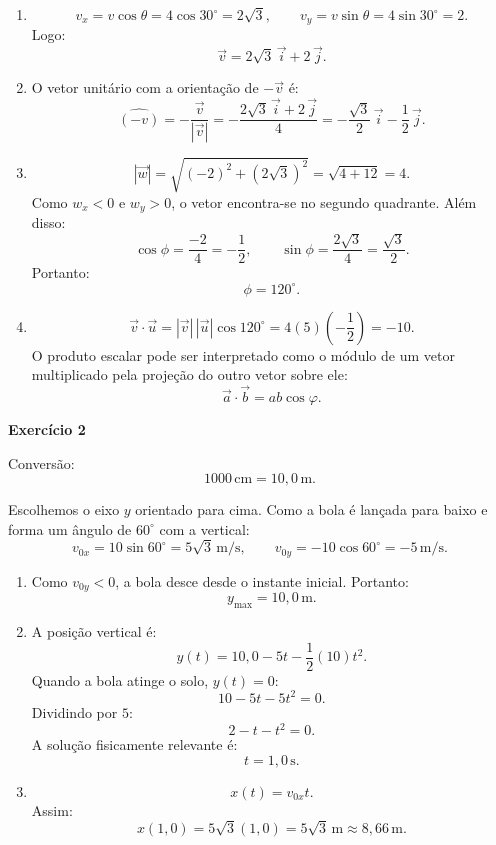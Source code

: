 \documentclass[12pt]{article}
\begin{document}
\begin{enumerate}[label=\textbf{\alph*)}]
    \item
    \[
    v_x=v\cos\theta=4\cos30^\circ=2\sqrt{3},
    \qquad
    v_y=v\sin\theta=4\sin30^\circ=2.
    \]
    Logo:
    \[
    \vec{v}=2\sqrt{3}\,\vec{i}+2\,\vec{j}.
    \]

    \item O vetor unitário com a orientação de $-\vec{v}$ é:
    \[
    \widehat{(-v)}
    =-\frac{\vec{v}}{|\vec{v}|}
    =-\frac{2\sqrt{3}\,\vec{i}+2\,\vec{j}}{4}
    =-\frac{\sqrt{3}}{2}\,\vec{i}-\frac12\,\vec{j}.
    \]

    \item
    \[
    |\vec{w}|=\sqrt{(-2)^2+(2\sqrt{3})^2}
    =\sqrt{4+12}=4.
    \]
    Como $w_x<0$ e $w_y>0$, o vetor encontra-se no segundo quadrante. Além disso:
    \[
    \cos\phi=\frac{-2}{4}=-\frac12,
    \qquad
    \sin\phi=\frac{2\sqrt{3}}{4}=\frac{\sqrt{3}}{2}.
    \]
    Portanto:
    \[
    \phi=120^\circ.
    \]

    \item
    \[
    \vec{v}\cdot\vec{u}
    =|\vec{v}|\,|\vec{u}|\cos120^\circ
    =4(5)\left(-\frac12\right)
    =-10.
    \]
    O produto escalar pode ser interpretado como o módulo de um vetor multiplicado
    pela projeção do outro vetor sobre ele:
    \[
    \vec{a}\cdot\vec{b}=ab\cos\varphi.
    \]
\end{enumerate}

\vspace{0.2cm}

\textbf{Exercício 2}

Conversão:
\[
1000\,\text{cm}=10,0\,\text{m}.
\]

Escolhemos o eixo $y$ orientado para cima. Como a bola é lançada para baixo e forma
um ângulo de $60^\circ$ com a vertical:
\[
v_{0x}=10\sin60^\circ=5\sqrt{3}\,\text{m/s},
\qquad
v_{0y}=-10\cos60^\circ=-5\,\text{m/s}.
\]

\begin{enumerate}[label=\textbf{\alph*)}]
    \item Como $v_{0y}<0$, a bola desce desde o instante inicial. Portanto:
    \[
    y_{\max}=10,0\,\text{m}.
    \]

    \item A posição vertical é:
    \[
    y(t)=10,0-5t-\frac12(10)t^2.
    \]
    Quando a bola atinge o solo, $y(t)=0$:
    \[
    10-5t-5t^2=0.
    \]
    Dividindo por $5$:
    \[
    2-t-t^2=0.
    \]
    A solução fisicamente relevante é:
    \[
    t=1,0\,\text{s}.
    \]

    \item
    \[
    x(t)=v_{0x}t.
    \]
    Assim:
    \[
    x(1,0)=5\sqrt{3}(1,0)
    =5\sqrt{3}\,\text{m}
    \approx8,66\,\text{m}.
    \]
\end{enumerate}
\end{document}
